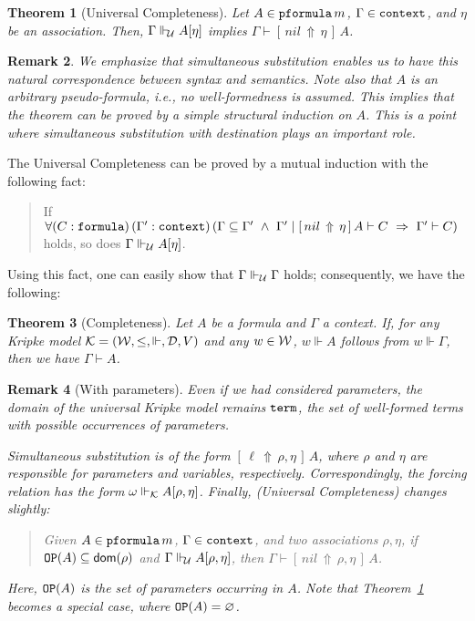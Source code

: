 \documentclass{svjour3}                     %
\newtheorem{thm}{Theorem}%
\newtheorem{rem}[thm]{Remark}
\newcommand{\cald}{{\cal D}}
\newcommand{\calk}{{\cal K}}
\newcommand{\calu}{{\cal U}}
\newcommand{\calw}{{\cal W}}
\newcommand{\To}{\,\,\Rightarrow\,\,}
\newcommand{\Ga}{\Gamma}
\newcommand{\om}{\omega}
\newcommand{\vd}{\vdash}
\newcommand{\Vd}{\Vdash}
\newcommand{\substa}[3]{[\,#3\, \Uparrow\, #2\,]\, #1}
\newcommand{\tm}{\subseteq}
\newcommand{\dom}{\mathrm{\textsf{dom}}}
\newcommand{\tpfml}{\textup{\tt pformula}}
\newcommand{\tterm}{\textup{\tt term}}
\newcommand{\tfml}{\textup{\tt formula}}
\newcommand{\tcontext}{\textup{\tt context}}
\newcommand{\tFV}{\textup{\tt OP}}
\begin{document}
\begin{thm}[Universal Completeness]\label{universal}
  Let $A \in \tpfml\, m$, $\Ga \in \tcontext$, and $\eta$ be an association. Then, $\Ga \Vd_{\!\calu} A [\eta]$ implies $\Ga \vd  \substa{A}{\eta}{nil}$.
\end{thm}

\begin{rem}\label{rem:universal}
  We emphasize that simultaneous substitution enables us to have this natural correspondence between syntax and semantics. Note also that $A$ is an arbitrary pseudo-formula, i.e., no well-formedness is assumed. This implies that the theorem can be proved by a simple structural induction on $A$. This is a point where simultaneous substitution with destination plays an important role.
\end{rem}

\noindent The Universal Completeness can be proved by a mutual induction
 with the following fact:
\begin{quote}
  If  $\forall (C : \tfml)\, (\Ga' : \tcontext)\, (\Ga \tm \Ga' \,\, \wedge\,\, \Ga' \mid \substa{A}{\eta}{nil} \vd C \To \Ga' \vd C)$ holds,
  so does $\Ga \Vd_\calu A [\eta]$.  
\end{quote}

Using this fact, one can easily show that $\Ga \Vd_\calu \Ga$ holds; consequently, we have the following:

\begin{thm}[Completeness]\label{completeness}
  Let $A$ be a formula and $\Ga$ a context. If, for any Kripke model
  $\calk = (\calw, \le, \Vd, \cald, V)$ and any $w \in \calw$, $w \Vd A$
  follows from $w \Vd \Ga$, then we have $\Ga \vd A$.
\end{thm}

\begin{rem}[With parameters]\label{var-cpltness}
  Even if we had considered parameters, the domain of the universal Kripke model remains $\tterm$, the set of well-formed terms with possible occurrences of parameters.

  Simultaneous substitution is of the form $\substa{A}{\rho,\eta}{\ell}$, where $\rho$ and $\eta$ are responsible for parameters and variables, respectively. Correspondingly, the forcing relation has the form $\om \Vd_\calk A [\rho, \eta]$. Finally, (Universal Completeness) changes slightly:
  \begin{quote}
    Given $A \in \tpfml\, m$, $\Ga \in \tcontext$, and two associations $\rho, \eta$, if $\tFV (A)\subseteq \dom (\rho)$ and $\Ga \Vd_{\!\calu} A [\rho,\eta]$, then $\Ga \vd  \substa{A}{\rho, \eta}{nil}$.    
  \end{quote}
Here, $\tFV(A)$ is the set of parameters occurring in $A$. Note that Theorem~\ref{universal} becomes a special case, where $\tFV(A) = \varnothing$.
\end{rem}
\end{document}
